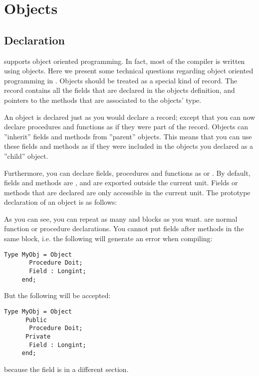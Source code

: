 \documentclass{report}
\begin{document}

\chapter{Objects}
\label{ch:Objects}

\section{Declaration}
\fpc supports object oriented programming. In fact, most  of the compiler is
written using objects. Here we present some technical questions regarding
object oriented programming in \fpc.
Objects should be treated as a special kind of record. The record contains
all the fields that are declared in the objects definition, and pointers
to the methods that are associated to the objects' type.

An object is declared just as you would declare a record; except that you
can now declare procedures and functions as if they were part of the record.
Objects can ''inherit'' fields and methods from ''parent'' objects. This means
that you can use these fields and methods as if they were included in the
objects you declared as a ''child'' object.

Furthermore, you can declare fields, procedures and functions as 
or . By default, fields and methods are , and are
exported outside the current unit. Fields or methods that are declared
 are only accessible in the current unit.
The prototype declaration of an object is as follows:

As you can see, you can repeat as many  and 
blocks as you want.
 are normal function or procedure declarations.
You cannot put fields after methods in the same block, i.e. the following
will generate an error when compiling:
\begin{verbatim}
Type MyObj = Object
       Procedure Doit;
       Field : Longint;
     end;
\end{verbatim}
But the following will be accepted:
\begin{verbatim}
Type MyObj = Object
      Public
       Procedure Doit;
      Private
       Field : Longint;
     end;
\end{verbatim}
because the field is in a different section.
\end{document}

